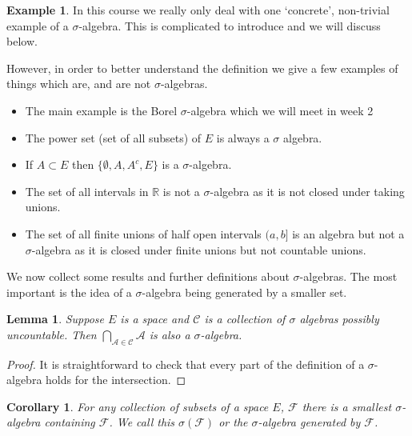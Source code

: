 \documentclass[
]{book}
\providecommand{\tightlist}{%
  \setlength{\itemsep}{0pt}\setlength{\parskip}{0pt}}
\newtheorem{lemma}{Lemma}[chapter]
\newtheorem{corollary}{Corollary}[chapter]
\theoremstyle{definition}
\theoremstyle{definition}
\newtheorem{example}{Example}[chapter]
\theoremstyle{definition}
\theoremstyle{definition}
\theoremstyle{remark}
\begin{document}
\begin{example}

In this course we really only deal with one `concrete', non-trivial example of a \(\sigma\)-algebra. This is complicated to introduce and we will discuss below.

However, in order to better understand the definition we give a few examples of things which are, and are not \(\sigma\)-algebras.

\begin{itemize}
\tightlist
\item
  The main example is the Borel \(\sigma\)-algebra which we will meet in week 2
\item
  The power set (set of all subsets) of \(E\) is always a \(\sigma\) algebra.
\item
  If \(A \subset E\) then \(\{\emptyset, A, A^c, E\}\) is a \(\sigma\)-algebra.
\item
  The set of all intervals in \(\mathbb{R}\) is not a \(\sigma\)-algebra as it is not closed under taking unions.
\item
  The set of all finite unions of half open intervals \((a,b]\) is an algebra but not a \(\sigma\)-algebra as it is closed under finite unions but not countable unions.
\end{itemize}

\end{example}

We now collect some results and further definitions about \(\sigma\)-algebras. The most important is the idea of a \(\sigma\)-algebra being generated by a smaller set.

\begin{lemma}
Suppose \(E\) is a space and \(\mathcal{C}\) is a collection of \(\sigma\) algebras possibly uncountable. Then \(\bigcap_{\mathcal{A} \in \mathcal{C}} \mathcal{A}\) is also a \(\sigma\)-algebra.
\end{lemma}

\begin{proof}
It is straightforward to check that every part of the definition of a \(\sigma\)-algebra holds for the intersection.
\end{proof}

\begin{corollary}
For any collection of subsets of a space \(E\), \(\mathcal{F}\) there is a smallest \(\sigma\)-algebra containing \(\mathcal{F}\). We call this \(\sigma(\mathcal{F})\) or the \(\sigma\)-algebra generated by \(\mathcal{F}\).
\end{corollary}
\end{document}
